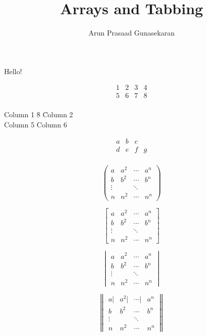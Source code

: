 \documentclass[10pt,a4paper]{article}
\author{Arun Prasaad Gunasekaran}
\title{Arrays and Tabbing}
\begin{document}
\maketitle

Hello!

$$
\begin{array}{|c|l|c|r|}
\hline
1 & 2 & 3 & 4 \\\hline
5 & 6 & 7 & 8 \\

\end{array}
$$

\begin{tabbing}

Column 1 \= 8 \= Column 2 \\
Column 5      \>      Column 6

\end{tabbing}

$$
\begin{matrix}
a & b & c \\
d & e & f & g \\
\end{matrix}
$$

$$
\begin{pmatrix}
a & a^2 & \cdots & a^n \\
b & b^2 & \cdots & b^n \\
\vdots & & \ddots \\
n & n^2 & \cdots & n^n
\end{pmatrix}
$$

$$
\begin{bmatrix}
a & a^2 & \cdots & a^n \\
b & b^2 & \cdots & b^n \\
\vdots & & \ddots \\
n & n^2 & \cdots & n^n
\end{bmatrix}
$$

$$
\begin{vmatrix}
a & a^2 & \cdots & a^n \\
b & b^2 & \cdots & b^n \\
\vdots & & \ddots \\
n & n^2 & \cdots & n^n
\end{vmatrix}
$$

$$
\begin{Vmatrix}
a | & a^2 | & \cdots | & a^n \\\hline
b & b^2 & \cdots & b^n \\
\vdots & & \ddots \\
n & n^2 & \cdots & n^n
\end{Vmatrix}
$$
\end{document}
